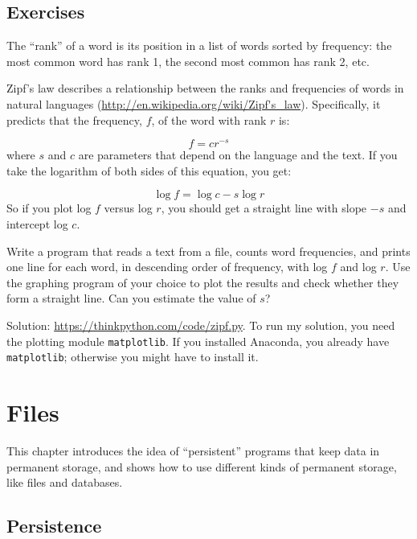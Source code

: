 \documentclass[10pt]{book}
\begin{document}
\section{Exercises}

\begin{exercise}

The ``rank'' of a word is its position in a list of words
sorted by frequency: the most common word has rank 1, the
second most common has rank 2, etc.

Zipf's law describes a relationship between the ranks and frequencies
of words in natural languages
(\url{http://en.wikipedia.org/wiki/Zipf's_law}).  Specifically, it
predicts that the frequency, $f$, of the word with rank $r$ is:

\[ f = c r^{-s} \]
%
where $s$ and $c$ are parameters that depend on the language and the
text.  If you take the logarithm of both sides of this equation, you
get:

\[ \log f = \log c - s \log r \]
%
So if you plot log $f$ versus log $r$, you should get
a straight line with slope $-s$ and intercept log $c$.

Write a program that reads a text from a file, counts
word frequencies, and prints one line
for each word, in descending order of frequency, with
log $f$ and log $r$.  Use the graphing program of your
choice to plot the results and check whether they form
a straight line.  Can you estimate the value of $s$?

Solution: \url{https://thinkpython.com/code/zipf.py}.
To run my solution, you need the plotting module {\tt matplotlib}.
If you installed Anaconda, you already have {\tt matplotlib};
otherwise you might have to install it.

\end{exercise}



\chapter{Files}

This chapter introduces the idea of ``persistent'' programs that
keep data in permanent storage, and shows how to use different
kinds of permanent storage, like files and databases.


\section{Persistence}
\end{document}
